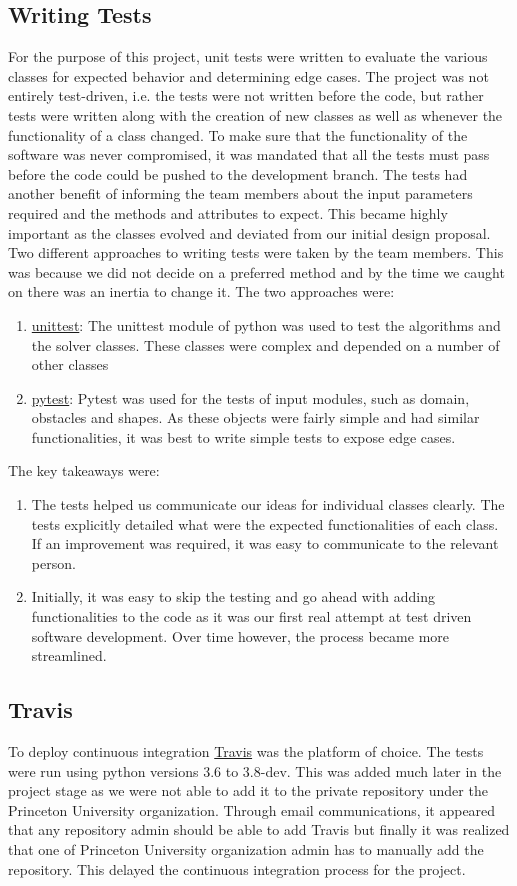 \subsection{Writing Tests}
For the purpose of this project, unit tests were written to evaluate the various classes for expected behavior and determining edge cases. The project was not entirely test-driven, i.e. the tests were not written before the code, but rather tests were written along with the creation of new classes as well as whenever the functionality of a class changed. To make sure that the functionality of the software was never compromised, it was mandated that all the tests must pass before the code could be pushed to the {\ttfamily development} branch. The tests had another benefit of informing the team members about the input parameters required and the methods and attributes to expect. This became highly important as the classes evolved and deviated from our initial design proposal. Two different approaches to writing tests were taken by the team members. This was because we did not decide on a preferred method and by the time we caught on there was an inertia to change it. The two approaches were:
\begin{enumerate}
	\item \href{https://docs.python.org/3.6/library/unittest.html#module-unittest}{unittest}: The unittest module of python was used to test the algorithms and the solver classes. These classes were complex and depended on a number of other classes
	\item \href{https://docs.pytest.org/en/latest/}{pytest}: Pytest was used for the tests of input modules, such as domain, obstacles and shapes. As these objects were fairly simple and had similar functionalities, it was best to write simple tests to expose edge cases.
\end{enumerate}
The key takeaways were:
\begin{enumerate}
\item The tests helped us communicate our ideas for individual classes clearly. The tests explicitly detailed what were the expected functionalities of each class. If an improvement was required, it was easy to communicate to the relevant person.
\item Initially, it was easy to skip the testing and go ahead with adding functionalities to the code as it was our first real attempt at test driven software development. Over time however, the process became more streamlined.
\end{enumerate}
\subsection{Travis}
To deploy continuous integration \href{https://travis-ci.com}{Travis} was the platform of choice. The tests were run using python versions 3.6 to 3.8-dev. This was added much later in the project stage as we were not able to add it to the private repository under the Princeton University organization. Through email communications, it appeared that any repository admin should be able to add Travis but finally it was realized that one of Princeton University organization admin has to manually add the repository. This delayed the continuous integration process for the project.